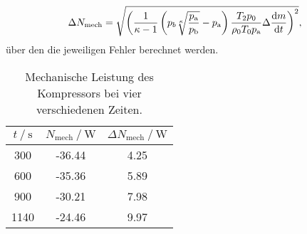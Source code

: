 \begin{equation}
    \Delta N _\text{mech} = \sqrt{\left(\frac{1}{\kappa - 1} \left( p_b \sqrt[\kappa]{\frac{p_\text{a}}{p_\text{b}}} - p_\text{a} \right) \frac{T_2 p_0}{\rho _0 T_0 p_\text{a}} \Delta \dv{m}{t}\right)^2 },
    \label{eq:n_err}
\end{equation}
über den die jeweiligen Fehler berechnet werden.
\begin{table}
    \centering
    \begin{tabular}{c c c}
        \toprule
        {$t \:/\: \si{\second}$} & {$ N _\text{mech} \:/\: \si{\watt} $} & {$\Delta N _\text{mech} \:/\: \si{\watt}$}\\
        \midrule

        300  &   -36.44  & 4.25  \\
        600  &   -35.36  & 5.89  \\
        900  &   -30.21  & 7.98  \\
        1140 &   -24.46  & 9.97  \\
        \bottomrule
    \end{tabular}
    \caption{Mechanische Leistung des Kompressors bei vier verschiedenen Zeiten.}
    \label{tab:leistung}
\end{table}